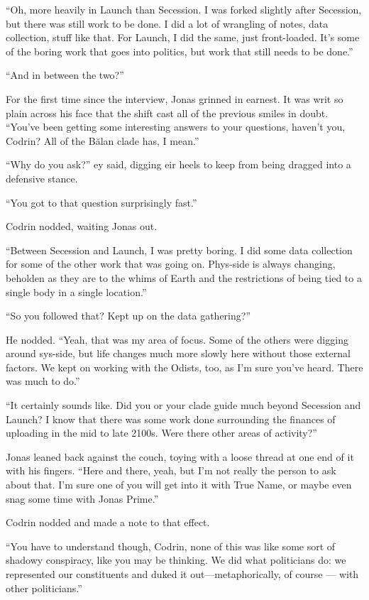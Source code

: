 ``Oh, more heavily in Launch than Secession. I was forked slightly after Secession, but there was still work to be done. I did a lot of wrangling of notes, data collection, stuff like that. For Launch, I did the same, just front-loaded. It's some of the boring work that goes into politics, but work that still needs to be done.''

``And in between the two?''

For the first time since the interview, Jonas grinned in earnest. It was writ so plain across his face that the shift cast all of the previous smiles in doubt. ``You've been getting some interesting answers to your questions, haven't you, Codrin? All of the Bălan clade has, I mean.''

``Why do you ask?'' ey said, digging eir heels to keep from being dragged into a defensive stance.

``You got to that question surprisingly fast.''

Codrin nodded, waiting Jonas out.

``Between Secession and Launch, I was pretty boring. I did some data collection for some of the other work that was going on. Phys-side is always changing, beholden as they are to the whims of Earth and the restrictions of being tied to a single body in a single location.''

``So you followed that? Kept up on the data gathering?''

He nodded. ``Yeah, that was my area of focus. Some of the others were digging around sys-side, but life changes much more slowly here without those external factors. We kept on working with the Odists, too, as I'm sure you've heard. There was much to do.''

``It certainly sounds like. Did you or your clade guide much beyond Secession and Launch? I know that there was some work done surrounding the finances of uploading in the mid to late 2100s. Were there other areas of activity?''

Jonas leaned back against the couch, toying with a loose thread at one end of it with his fingers. ``Here and there, yeah, but I'm not really the person to ask about that. I'm sure one of you will get into it with True Name, or maybe even snag some time with Jonas Prime.''

Codrin nodded and made a note to that effect.

``You have to understand though, Codrin, none of this was like some sort of shadowy conspiracy, like you may be thinking. We did what politicians do: we represented our constituents and duked it out---metaphorically, of course — with other politicians.''

